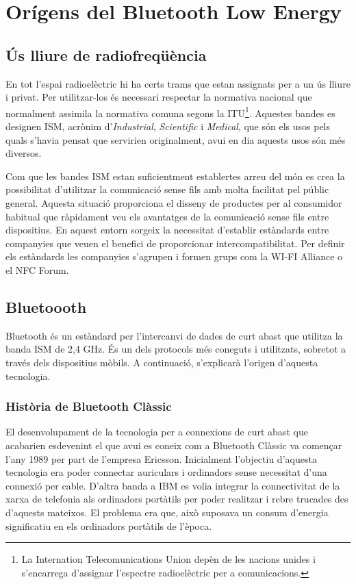 \chapter{Orígens del Bluetooth Low Energy}\label{C:compaginacio}

\section{Ús lliure de radiofreqüència}
En tot l'espai radioelèctric hi ha certs trams que estan assignats per a un ús lliure i privat.
Per utilitzar-los és necessari respectar la normativa nacional que normalment assimila la normativa comuna segons la ITU\footnote{La Internation Telecomunications Union depèn de les nacions unides i s'encarrega d'assignar l'espectre radioelèctric per a comunicacions.}.
Aquestes bandes es designen ISM, acrònim d'\textit{Industrial}, \textit{Scientific} i \textit{Medical}, que són els usos pels quals s'havia pensat que servirien originalment, avui en dia aquests usos són més diversos.

Com que les bandes ISM estan suficientment establertes arreu del món es crea la possibilitat d'utilitzar la comunicació sense fils amb molta facilitat pel públic general.
Aquesta situació proporciona el disseny de productes per al consumidor habitual que ràpidament veu els avantatges de la comunicació sense fils entre dispositius.
En aquest entorn sorgeix la necessitat d'establir estàndards entre companyies que veuen el benefici de proporcionar intercompatibilitat.
Per definir els estàndards les companyies s'agrupen i formen grups com la WI-FI Alliance o el NFC Forum.

\section{Bluetoooth}
Bluetooth és un estàndard per l'intercanvi de dades de curt abast que utilitza la banda ISM de 2,4 GHz.
És un dels protocols més coneguts i utilitzats, sobretot a través dels dispositius mòbils.
A continuació, s'explicarà l'origen d'aquesta tecnologia.

\subsection{Història de Bluetooth Clàssic}
El desenvolupament de la tecnologia per a connexions de curt abast que acabarien esdevenint el que avui es coneix com a Bluetooth Clàssic va començar l'any 1989 per part de l'empresa Ericsson.
Inicialment l'objectiu d'aquesta tecnologia era poder connectar auriculars i ordinadors sense necessitat d'una connexió per cable.
D'altra banda a IBM es volia integrar la connectivitat de la xarxa de telefonia als ordinadors portàtils per poder realitzar i rebre trucades des d'aquests mateixos.
El problema era que, això suposava un consum d'energia significatiu en els ordinadors portàtils de l'època.

